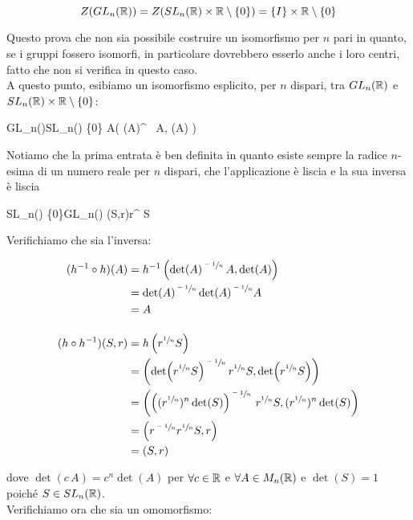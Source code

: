 \begin{equation}
	Z(GL_{n}(\mathbb{R})) = Z(SL_{n}(\mathbb{R}) \times \mathbb{R} \setminus \{0\}) = \{ I \} \times \mathbb{R} \setminus \{0\}
\end{equation}

Questo prova che non sia possibile costruire un isomorfismo per $ n $ pari in quanto, se i gruppi fossero isomorfi, in particolare dovrebbero esserlo anche i loro centri, fatto che non si verifica in questo caso.\\
A questo punto, esibiamo un isomorfismo esplicito, per $ n $ dispari, tra $ GL_{n}(\mathbb{R}) $ e $ SL_{n}(\mathbb{R}) \times \mathbb{R} \setminus \{0\} $:

%
	{GL_{n}(\R)}{SL_{n}(\R) \times \R \setminus \{0\}}%
	{A}{\left( \det(A)^{} \, A, \det(A) \right)}

Notiamo che la prima entrata è ben definita in quanto esiste sempre la radice $ n $-esima di un numero reale per $ n $ dispari, che l'applicazione è liscia e la sua inversa è liscia

%
	{SL_{n}(\R) \times \R \setminus \{0\}}{GL_{n}(\R)}%
	{(S,r)}{r^{} S}
	
Verifichiamo che sia l'inversa:

\begin{align}
	\begin{split}
		(h^{-1} \circ h)(A) &= h^{-1} \left( \det(A)^{\sfrac{-1}{n}} \, A, \det(A) \right)\\
		&= \det(A)^{\sfrac{-1}{n}} \det(A)^{\sfrac{-1}{n}} A\\
		&= A\\\\
		(h \circ h^{-1})(S,r) &= h \left( r^{\sfrac{1}{n}} S \right)\\
		&= \left( \det(r^{\sfrac{1}{n}} S)^{\sfrac{-1}{n}} \, r^{\sfrac{1}{n}} S, \det(r^{\sfrac{1}{n}} S) \right)\\
		&= \left( \left( (r^{\sfrac{1}{n}})^{n} \det(S) \right)^{\sfrac{-1}{n}} \, r^{\sfrac{1}{n}} S, (r^{\sfrac{1}{n}})^{n} \det(S) \right)\\
		&= \left( r^{\sfrac{-1}{n}} r^{\sfrac{1}{n}} S, r \right)\\
		&= (S,r)
	\end{split}
\end{align}

dove $ \det(c \, A) = c^{n} \det(A) $ per $ \forall c \in \mathbb{R} $ e $ \forall A \in M_{n}(\mathbb{R}) $ e $ \det(S) = 1 $ poiché $ S \in SL_{n} (\mathbb{R}) $.\\
Verifichiamo ora che sia un omomorfismo:

